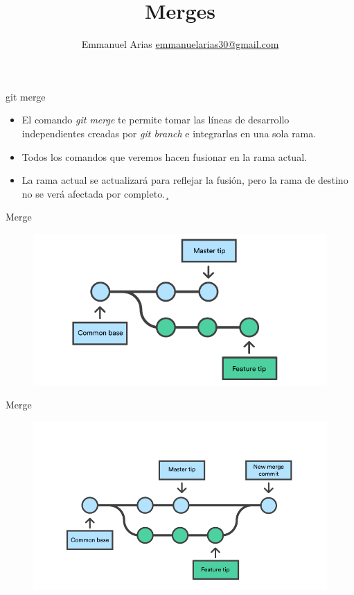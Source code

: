 \documentclass{beamer}
\title{Merges}
\author{Emmanuel Arias \href{mailto:emmanuelarias30@gmail.com}{emmanuelarias30@gmail.com}}
\date{}
\begin{document}
\begin{frame}[plain]
    \maketitle
\end{frame}

\begin{frame}{git merge}
	\begin{itemize}
		 \item El comando \textit{git merge} te permite tomar las líneas de desarrollo independientes creadas por \textit{git branch} e integrarlas en una sola rama.
		 \item Todos los comandos que veremos hacen fusionar en la rama actual. 
		 \item La rama actual se actualizará para reflejar la fusión, pero la rama de destino no se verá afectada por completo.¸
	\end{itemize}
\end{frame}

\begin{frame}{Merge}
\begin{figure}
	\includegraphics[width=1\linewidth]{img/Branch-2}
	\label{fig:branch-2}
\end{figure}
\end{frame}

\begin{frame}{Merge}
	\begin{figure}
		\includegraphics[width=1\linewidth]{img/Branch-3}
		\label{fig:branch-3}
	\end{figure}
\end{frame}
\end{document}
